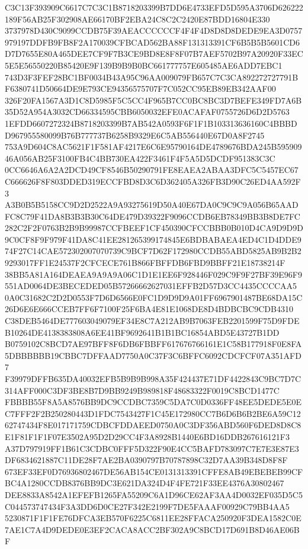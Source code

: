 \documentclass[UTF8,fontset=fandol,zihao=-4,a4paper]{ctexart}
\begin{document}
{{C3C13F393909C6617C7C3C1B8718203399B7DD6E4733EFD5D595A3706D626222189F56AB25F302908AE66170BF2EBA24C8C2C2420E87BDD16804E330
3737978D430C9099CCDB75F39AEACCCCCCF4F4F4D8D8D8DEDE9EA3D0757979197DDFB9FB8F2A170039CFBCAD562BA88F131313391CF6B5B5B5601CD6
D7D7655E80A465DEE7CF9F7B3CE9BD8E8F8F07B7AEF5702B97A20920F33EC5E5E56550220B85420E9F139B9B9B0BC661777757E605485AE6ADD7EBC1
743D3F3FEF28BC1BF0034B43A95C96AA009079FB657C7C3CA892272727791BF6380741D50664DE9E793CE94356575707F7C052CC95EB89EB342AAF00
326F20FA1567A3D1C8D5985F5C5CC4F965B7CC0BC8BC3D7BEFE349FD7A6B35D52A954A3032CD66334595CBB6050032EFE0ACAFAF0755726D6D2D5763
1EFDD6607272324B8718203399B7AB542A0593F6F1F1B103313636160C4BBBDD967955580099B76B777737B6258B9329E6C5AB556440E67D0A8F2745
753A9D604C8AC5621F1F581AF4217E6C6E95790164DE4789676BDA245B59590946A056AB25F3100FB4C4BB730EA422F3461F4F5A5D5DCDF951383C3C
0CC6646A6A2A2DCD49CF8546B50290791FE8EAEA2ABAA3DFC5C5457EC67C666626F8F803DDED319ECCFBD8D3C6D362405A326FB3D90C26ED4AA592F3
A3B0B5B5158CC9D2D2522A9A93275619D50A40E67DA0C9C9C9A056B65AADFC8C79F41DA8B3B3B30C64DE479D39322F9096CCDB6EB78349BB3B8DE7FC
282C2F2F0763B2B9B99987CCFBEEF1CF450390CFCCBBB0B010D4CA9D9D9D9C0CF8F9F979F41DA8C41EE281265399174845E6BDBABAEA4ED4C1D4DDE9
74F27C14CAE572302007070739C9BCF7D62F172980CCDB55ABD5825AB9B2B29293017FF1E24537F2CFCECE761B866FBFFDB6FBD9BBFF21E18738214F
38BB5A81A164DEAEA9A9A9A06C1D1E1EE6F928446F029C9F9F27BF39E96F9551AD0064DE3BECEDED05B57266662627031EFFB2D57D3CC4435CCCCAA5
0A0C31682C2D2D0553F7D6D6566E0FC1D9D9D9A01FF6967901487BE68DA15C26D6E6E666CCEB7FF6F7100F25F6BA4E81E1068DE8D4BDBCBC9CDB4310
C38DEB5464DE777603049079EF34E8C7A212AB9B7063FEB2201599F75D9FDEB10264DE4138383808A6EE41BF9692641B1B1BC16854ABD5E43727B1DD
B0759102C8BCD7AE97BFF8F6DB6FBBFF617676766161E1C58B177918F0E8FA5DBBBBBB19CBBC7DFFAAD7750A0C37F3C6BFFC6092CDCFCF07A351AFD7
F39979DFFB635DA40032EFB5B9B9B998A35F424437E71DF4422843C9BC7D7C314AFF000C3DF3BE8B7D9BB9249B989818F48683322F0019C8BCD1477C
FBBBB55F8A5A8576BB9DC9CCDBC7359C5DA7C0D0336FF48EE5DEDE5E0EC7FFF2F2B250280443D1FDC7543427F1C45E172980CC7B6D6B6B2BE6A59C12
62747434F8E017171759CDBCFDDAEED0750A0C3DF356ABD560F6DED8D8C8E1F81F1F1F07E3502A95D2D29CC4F3A8928B1440E6BD16DDB267616121F3
A37D797919FF1B61C3CDBC0FFF5D322F90E4CC5BAFD783097C7E7E3E87E3DF6834621887C11DE28F7AE2BA0390797B70787898C32D7AA39B348D8F8F
673EF33EF0D76936802467DE56AB154CE0131313391CFFE8AB49EBEBEB99CFBC4A1280CCDB8376BB9DC3E621DA324D4F4FE721F33EE4376A30802467
DEE8833A8542A1EFEFB1265FA55209C6A1D96CE62AF3AA4D0032EF035D5C5C044573747434F3A3DD6D0CE27F342E2199F7DE5FAAAF00929C79BB4AA5
5230871F1F1FE76DFCA3EB570F6225C6811EE28FFACA250920F3DEA1582C0E7AE1C7A4D9DEDE0E3EF2CACA8ACC2BF302A9C8BCD17D691B8D46AE06BF
}}
\end{document}

